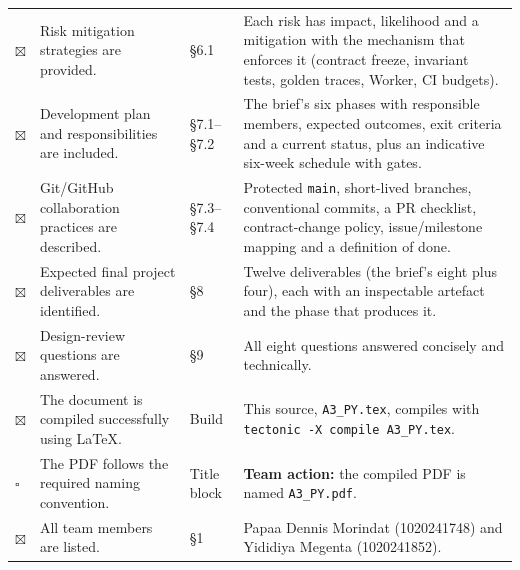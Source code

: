 \documentclass[11pt,a4paper]{article}
\newcommand{\ct}[1]{\texttt{#1}}
\newcommand{\done}{\textcolor{okc}{$\boxtimes$}}
\newcommand{\todo}{\textcolor{rulec}{$\square$}}
\begin{document}
{\begin{longtable}{@{}C{0.7cm}L{6.4cm}L{2.3cm}L{5.6cm}@{}}
\done & Risk mitigation strategies are provided. &
\S6.1 & Each risk has impact, likelihood and a mitigation with the mechanism that enforces
it (contract freeze, invariant tests, golden traces, Worker, CI budgets). \\

\done & Development plan and responsibilities are included. &
\S7.1--\S7.2 & The brief's six phases with responsible members, expected outcomes, exit
criteria and a current status, plus an indicative six-week schedule with gates. \\

\done & Git/GitHub collaboration practices are described. &
\S7.3--\S7.4 & Protected \ct{main}, short-lived branches, conventional commits, a PR
checklist, contract-change policy, issue/milestone mapping and a definition of done. \\

\done & Expected final project deliverables are identified. &
\S8 & Twelve deliverables (the brief's eight plus four), each with an inspectable artefact
and the phase that produces it. \\

\done & Design-review questions are answered. &
\S9 & All eight questions answered concisely and technically. \\

\done & The document is compiled successfully using \LaTeX. &
Build & This source, \ct{A3\_PY.tex}, compiles with \ct{tectonic -X compile A3\_PY.tex}. \\

\todo & The PDF follows the required naming convention. &
Title block & \textbf{Team action:} the compiled PDF is named \ct{A3\_PY.pdf}. \\

\done & All team members are listed. &
\S1 & Papaa Dennis Morindat (1020241748) and Yididiya Megenta (1020241852). \\

\end{longtable}
}
\end{document}

